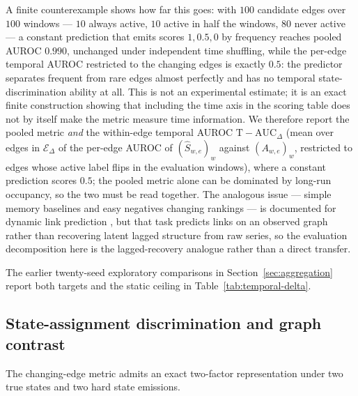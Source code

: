 \documentclass[11pt]{article}
\begin{document}
A finite counterexample shows how far this goes: with $100$ candidate edges over
$100$ windows --- $10$ always active, $10$ active in half the windows, $80$ never
active --- a constant prediction that emits scores $1,0.5,0$ by frequency reaches
pooled AUROC $0.990$, unchanged under independent time shuffling, while
the per-edge temporal AUROC restricted to the changing edges is exactly $0.5$:
the predictor separates frequent from rare edges almost perfectly and has no
temporal state-discrimination ability at all. This is not an experimental estimate; it is
an exact finite construction showing that including the time axis in the scoring
table does not by itself make the metric measure time information. We therefore
report the pooled metric \emph{and} the within-edge temporal AUROC
$\mathrm{T\!-\!AUC}_{\Delta}$ (mean over edges in $\mathcal E_\Delta$ of the
per-edge AUROC of $(\widehat S_{w,e})_w$ against $(A_{w,e})_w$, restricted to
edges whose active label flips in the evaluation windows), where a constant
prediction scores $0.5$; the pooled metric alone can be dominated by long-run
occupancy, so the two must be read together. The analogous issue --- simple
memory baselines and easy negatives changing rankings --- is documented for
dynamic link prediction \citep{poursafaei2022towards}, but that task predicts
links on an observed graph rather than recovering latent lagged structure from
raw series, so the evaluation decomposition here is the lagged-recovery analogue
rather than a direct transfer.

The earlier twenty-seed exploratory comparisons in Section~\ref{sec:aggregation}
report both targets and the static ceiling in Table~\ref{tab:temporal-delta}.

\subsection{State-assignment discrimination and graph contrast}
\label{sec:state-factor}

The changing-edge metric admits an exact two-factor representation under two
true states and two hard state emissions.
\end{document}

